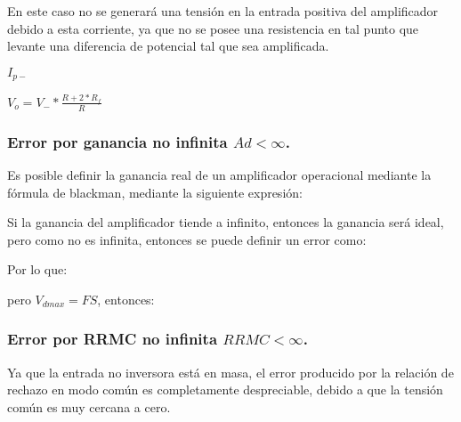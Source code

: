     En este caso no se generará una tensión en la entrada positiva del amplificador debido a esta corriente, ya que no se posee una resistencia en tal punto que levante una diferencia de potencial tal que sea amplificada.\\
    
\begin{center}
    \textbf{$I_{p-}$}\\
\end{center}

    $V_{o} = V_{-} * \frac{R + 2*R_{f}}{R}$\\
    
    \begin{center}
    \end{center}


\subsubsection{Error por ganancia no infinita $Ad < \infty$.}
    Es posible definir la ganancia real de un amplificador operacional mediante la fórmula de blackman, mediante la siguiente expresión:

    \begin{center}
    \end{center}

    Si la ganancia del amplificador tiende a infinito, entonces la ganancia será ideal, pero como no es infinita, entonces se puede definir un error como:\\

    \begin{center}
    \end{center}

     Por lo que:\\

    \begin{center}
    \end{center}

    pero $V_{dmax} = FS$, entonces:

    \begin{center}
    \end{center}

    \newpage
\subsubsection{Error por RRMC no infinita $RRMC < \infty$.}
    Ya que la entrada no inversora está en masa, el error producido por la relación de rechazo en modo común es completamente despreciable, debido a que la tensión común es muy cercana a cero.
    
